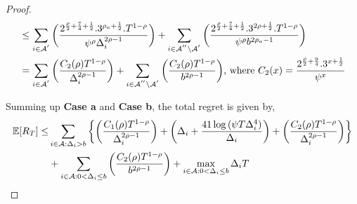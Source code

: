 \begin{proof}
\begin{align*}
&\leq\sum_{i\in \mathcal{A}^{'}}\bigg(\dfrac{2^{\frac{\rho}{2}+\frac{7}{4}+\frac{1}{2}}.3^{\rho_{a}+\frac{1}{2}}.T^{1-\rho } }{\psi^{\rho}\Delta_{i}^{2\rho -1}} \bigg)+\sum_{i\in \mathcal{A}^{''}\setminus \mathcal{A}^{'}}\bigg(\dfrac{2^{\frac{\rho}{2}+\frac{7}{4}+\frac{1}{2}}.3^{2\rho+\frac{1}{2}}.T^{1-\rho} }{\psi^{\rho }b^{2\rho_{a}-1}} \bigg)\\
& = \sum_{i\in \mathcal{A}^{'}}\bigg(\dfrac{ C_{2}(\rho) T^{1-\rho}}{\Delta_{i}^{2\rho-1}} \bigg)+\sum_{i\in \mathcal{A}^{''}\setminus \mathcal{A}^{'}}\bigg(\dfrac{C_{2}(\rho)T^{1-\rho}}{b^{2\rho -1}} \bigg) \text{, where } C_2(x) = \frac{2^{\frac{\rho}{2}+\frac{9}{4}}.3^{x+\frac{1}{2}}}{\psi^{x}}
\end{align*}
%
 
Summing up \textbf{Case a} and \textbf{Case b}, the total regret is given by,
\begin{align*}
 \mathbb{E} [R_{T}] \leq &\sum\limits_{i\in \mathcal{A} :\Delta_{i} > b}\bigg\lbrace\bigg(\dfrac{C_{1}(\rho)T^{1-\rho}}{\Delta_{i}^{2\rho -1}}\bigg) + \bigg(\Delta_{i}+\dfrac{41\log{(\psi  T\Delta_{i}^{4})}}{\Delta_{i}}\bigg) + \bigg(\dfrac{ C_{2}(\rho) T^{1-\rho}}{\Delta_{i}^{2\rho-1}} \bigg)\bigg \rbrace\\ 
  & +\sum\limits_{i\in \mathcal{A} :0 < \Delta_{i}\leq b}\bigg(\dfrac{C_{2}(\rho)T^{1-\rho}}{b^{2\rho -1}} \bigg) + \max_{i\in \mathcal{A} :0 < \Delta_{i}\leq b}\Delta_{i}T
\end{align*}
\end{proof}

